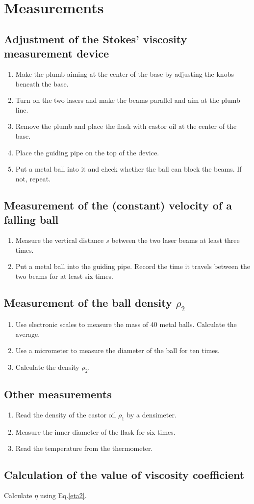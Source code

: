\section{Measurements}
\subsection{Adjustment of the Stokes' viscosity measurement device}
    \begin{enumerate}
        \item Make the plumb aiming at the center of the base by adjusting the knobs beneath the base.
        \item Turn on the two lasers and make the beams parallel and aim at the plumb line.
        \item Remove the plumb and place the flask with castor oil at the center of the base.
        \item Place the guiding pipe on the top of the device.
        \item Put a metal ball into it and check whether the ball can block the beams. If not, repeat. 
    \end{enumerate}
\subsection{Measurement of the (constant) velocity of a falling ball}
    \begin{enumerate}
        \item Measure the vertical distance $s$ between the two laser beams at least three times.
        \item Put a metal ball into the guiding pipe. Record the time it travels between the two beams for at least six times.
    \end{enumerate}
\subsection{Measurement of the ball density $\rho_2$}
    \begin{enumerate}
        \item Use electronic scales to measure the mass of 40 metal balls. Calculate the average.
        \item Use a micrometer to measure the diameter of the ball for ten times.
        \item Calculate the density $\rho_2$.
    \end{enumerate}
\subsection{Other measurements}
    \begin{enumerate}
        \item Read the density of the castor oil $\rho_1$ by a densimeter.
        \item Measure the inner diameter of the flask for six times.
        \item Read the temperature from the thermometer.
    \end{enumerate}    
\subsection{Calculation of the value of viscosity coefficient}
    Calculate $\eta$ using Eq.\ref{eta2}.
